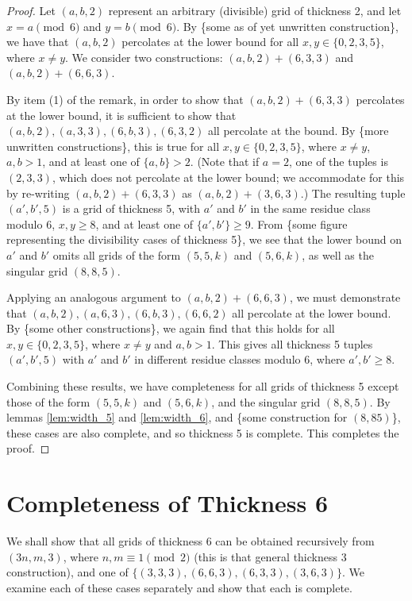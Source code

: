 \begin{proof}
Let $(a,b,2)$ represent an arbitrary (divisible) grid of thickness 2, and let $x = a \pmod 6$ and $y = b \pmod 6$. By \{some as of yet unwritten construction\}, we have that $(a,b,2)$ percolates at the lower bound for all $x,y \in \{0,2,3,5\}$, where $x \neq y$. We consider two constructions: $(a,b,2) + (6,3,3)$ and $(a,b,2) + (6,6,3)$. 

By item (1) of the remark, in order to show that $(a,b,2) + (6,3,3)$ percolates at the lower bound, it is sufficient to show that $(a,b,2), (a,3,3), (6,b,3), (6,3,2)$ all percolate at the bound. By \{more unwritten constructions\}, this is true for all $x,y \in \{0,2,3,5\}$, where $x \neq y$, $a,b > 1$, and at least one of $\{a,b\} > 2$. (Note that if $a=2$, one of the tuples is $(2,3,3)$, which does not percolate at the lower bound; we accommodate for this by re-writing $(a,b,2) + (6,3,3)$ as $(a,b,2) + (3,6,3)$.) The resulting tuple $(a', b', 5)$ is a grid of thickness 5, with $a'$ and $b'$ in the same residue class modulo $6$, $x,y \geq 8$, and at least one of $\{a',b'\} \geq 9$. From \{some figure representing the divisibility cases of thickness 5\}, we see that the lower bound on $a'$ and $b'$ omits all grids of the form $(5,5,k)$ and $(5,6,k)$, as well as the singular grid $(8,8,5)$. 

Applying an analogous argument to $(a,b,2) + (6,6,3)$, we must demonstrate that $(a,b,2), (a,6,3), (6,b,3), (6,6,2)$ all percolate at the lower bound. By \{some other constructions\}, we again find that this holds for all $x,y \in \{0,2,3,5\}$, where $x \neq y$ and $a,b > 1$. This gives all thickness 5 tuples $(a',b', 5)$ with $a'$ and $b'$ in different residue classes modulo $6$, where $a',b' \geq 8$. 

Combining these results, we have completeness for all grids of thickness 5 except those of the form $(5,5,k)$ and $(5,6,k)$, and the singular grid $(8,8,5)$. By lemmas \ref{lem:width_5} and \ref{lem:width_6}, and \{some construction for $(8,85)$\}, these cases are also complete, and so thickness 5 is complete. This completes the proof. 
\end{proof}

\section{Completeness of Thickness 6}
We shall show that all grids of thickness 6 can be obtained recursively from $(3n, m, 3)$, where $n,m \equiv 1 \pmod 2$ (this is that general thickness 3 construction), and one of $\{(3,3,3), (6,6,3), (6,3,3), (3,6,3)\}$. We examine each of these cases separately and show that each is complete. 

